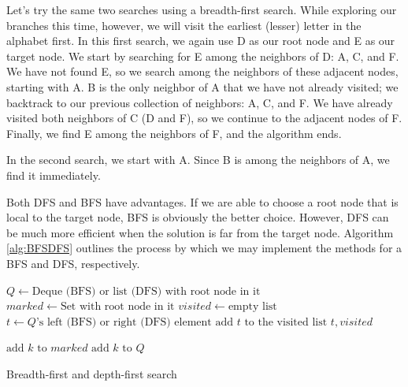 Let's try the same two searches using a breadth-first search. While exploring our branches this time, however,
we will visit the earliest (lesser) letter in the alphabet first. In this first search, we again use D as our root node and
E as our target node.
We start by searching for E among the neighbors of D: A, C, and F.
We have not found E, so we search among the neighbors of these adjacent nodes, starting with A.
B is the only neighbor of A that we have not already visited; we backtrack to our previous collection of neighbors: A, C, and F.
We have already visited both neighbors of C (D and F), so we continue to the adjacent nodes of F. Finally, we find E among the neighbors of F, and the algorithm ends.

In the second search, we start with A.
Since B is among the neighbors of A, we find it immediately.

Both DFS and BFS have advantages.
If we are able to choose a root node that is local to the target node, BFS is obviously the better choice. However,
DFS can be much more efficient when the solution is far from the target node.
Algorithm \ref{alg:BFSDFS} outlines the process by which we may implement the methods for a BFS and DFS, respectively.

\begin{algorithm}
\begin{algorithmic}[1]
	\State $Q \gets \text{Deque (BFS) or list (DFS) with root node in it}$	
	\State $marked \gets \text{Set with root node in it}$	
	\State $visited \gets \text{empty list}$	
							
		\State $t \gets Q\text{'s left (BFS) or right (DFS) element}$	
		\State $\text{add }t \text{ to the visited list}$
									
			\State {} $t,visited$
		
		\Else										{}
					\State $\text{add } k \text{ to } marked$
					\State $\text{add } k \text{ to } Q$
				\EndIf
			\EndFor
		\EndIf
	\EndWhile
\EndProcedure
\end{algorithmic}
\caption{Breadth-first and depth-first search}
\label{alg:BFSDFS}
\end{algorithm}

